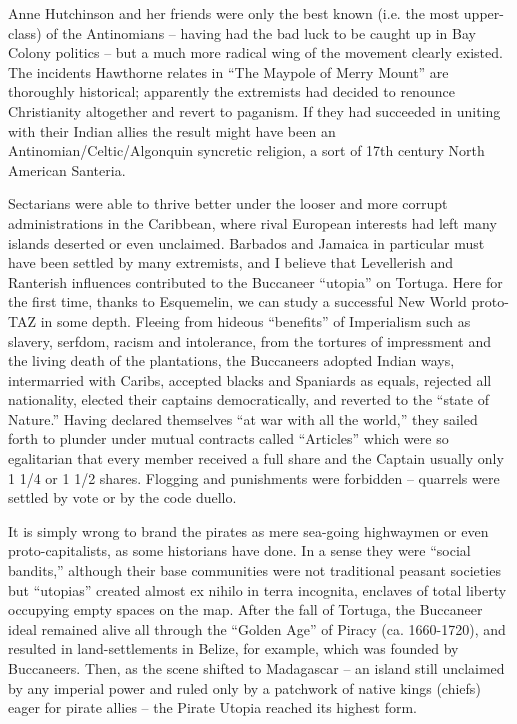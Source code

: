\documentclass[a4paper,english,10pt,twoside]{article}
\begin{document}
\medskip
Anne Hutchinson and her friends were only the best known (i.e. the most upper-class) of the Antinomians -- having had the bad luck to be caught up in Bay Colony politics -- but a much more radical wing of the movement clearly existed. The incidents Hawthorne relates in \enquote{The Maypole of Merry Mount} are thoroughly historical; apparently the extremists had decided to renounce Christianity altogether and revert to paganism. If they had succeeded in uniting with their Indian allies the result might have been an Antinomian/Celtic/Algonquin syncretic religion, a sort of 17th century North American Santeria.

\medskip
Sectarians were able to thrive better under the looser and more corrupt administrations in the Caribbean, where rival European interests had left many islands deserted or even unclaimed. Barbados and Jamaica in particular must have been settled by many extremists, and I believe that Levellerish and Ranterish influences contributed to the Buccaneer \enquote{utopia} on Tortuga. Here for the first time, thanks to Esquemelin, we can study a successful New World proto-TAZ in some depth. Fleeing from hideous \enquote{benefits} of Imperialism such as slavery, serfdom, racism and intolerance, from the tortures of impressment and the living death of the plantations, the Buccaneers adopted Indian ways, intermarried with Caribs, accepted blacks and Spaniards as equals, rejected all nationality, elected their captains democratically, and reverted to the \enquote{state of Nature.} Having declared themselves \enquote{at war with all the world,} they sailed forth to plunder under mutual contracts called \enquote{Articles} which were so egalitarian that every member received a full share and the Captain usually only 1 1/4 or 1 1/2 shares. Flogging and punishments were forbidden -- quarrels were settled by vote or by the code duello.

\medskip
It is simply wrong to brand the pirates as mere sea-going highwaymen or even proto-capitalists, as some historians have done. In a sense they were \enquote{social bandits,} although their base communities were not traditional peasant societies but \enquote{utopias} created almost ex nihilo in terra incognita, enclaves of total liberty occupying empty spaces on the map. After the fall of Tortuga, the Buccaneer ideal remained alive all through the \enquote{Golden Age} of Piracy (ca. 1660-1720), and resulted in land-settlements in Belize, for example, which was founded by Buccaneers. Then, as the scene shifted to Madagascar -- an island still unclaimed by any imperial power and ruled only by a patchwork of native kings (chiefs) eager for pirate allies -- the Pirate Utopia reached its highest form.
\end{document}
